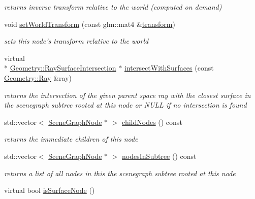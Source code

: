 \begin{DoxyCompactItemize}
\begin{DoxyCompactList}\small\item\em returns inverse transform relative to the world (computed on demand) \end{DoxyCompactList}\item 
void \hyperlink{classmotorcar_1_1SceneGraphNode_ac1a30cbe4af18133b19e6f852c33e30a}{set\-World\-Transform} (const glm\-::mat4 \&\hyperlink{classmotorcar_1_1SceneGraphNode_ad96e79fdd739ac8223a3128003be391a}{transform})
\begin{DoxyCompactList}\small\item\em sets this node's transform relative to the world \end{DoxyCompactList}\item 
virtual \\*
\hyperlink{structmotorcar_1_1Geometry_1_1RaySurfaceIntersection}{Geometry\-::\-Ray\-Surface\-Intersection} $\ast$ \hyperlink{classmotorcar_1_1SceneGraphNode_ac268b171317430368fcc7733eab05ae6}{intersect\-With\-Surfaces} (const \hyperlink{structmotorcar_1_1Geometry_1_1Ray}{Geometry\-::\-Ray} \&ray)
\begin{DoxyCompactList}\small\item\em returns the intersection of the given parent space ray with the closest surface in the scenegraph subtree rooted at this node or N\-U\-L\-L if no intersection is found \end{DoxyCompactList}\item 
std\-::vector$<$ \hyperlink{classmotorcar_1_1SceneGraphNode}{Scene\-Graph\-Node} $\ast$ $>$ \hyperlink{classmotorcar_1_1SceneGraphNode_a9a0c649390da0918afd58805192ccdca}{child\-Nodes} () const 
\begin{DoxyCompactList}\small\item\em returns the immediate children of this node \end{DoxyCompactList}\item 
std\-::vector$<$ \hyperlink{classmotorcar_1_1SceneGraphNode}{Scene\-Graph\-Node} $\ast$ $>$ \hyperlink{classmotorcar_1_1SceneGraphNode_aa7ac1c085afbe0fb0b9d5cd578a8c4ef}{nodes\-In\-Subtree} () const 
\begin{DoxyCompactList}\small\item\em returns a list of all nodes in this the scenegraph subtree rooted at this node \end{DoxyCompactList}\item 
virtual bool \hyperlink{classmotorcar_1_1SceneGraphNode_a161d962f2594172ea0f58a9e6167703b}{is\-Surface\-Node} ()
\end{DoxyCompactItemize}
